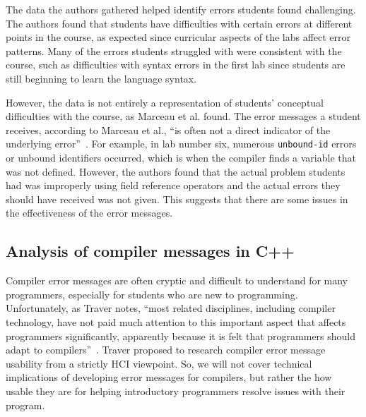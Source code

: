 \documentclass{sig-alternate}
\begin{document}
The data the authors gathered helped identify errors students found challenging.
The authors found that students have difficulties with certain errors at different points in the course, as expected since curricular aspects of the labs affect error patterns.
Many of the errors students struggled with were consistent with the course, such as difficulties with syntax errors in the first lab since students are still beginning to learn the language syntax.

However, the data is not entirely a representation of students' conceptual difficulties with the course, as Marceau et al. found.
The error messages a student receives, according to Marceau et al., ``is often not a direct indicator of the underlying error''~\cite{Marceau:2011:MEE:1953163.1953308}.
For example, in lab number six, numerous \texttt{unbound-id} errors  or unbound identifiers occurred, which is when the compiler finds a variable that was not defined.
However, the authors found that the actual problem students had was improperly using field reference operators and the actual errors they should have received was not given.
This suggests that there are some issues in the effectiveness of the error messages.

\subsection{Analysis of compiler messages in C++}\label{subsec:compiler analysis}

Compiler error messages are often cryptic and difficult to understand for many programmers, especially for students who are new to programming.
Unfortunately, as Traver notes, ``most related disciplines, including compiler technology, have not paid much attention to this important aspect that affects programmers significantly, apparently because it is felt that programmers should adapt to compilers''~\cite{Traver:2010}.
Traver proposed to research compiler error message usability from a strictly HCI viewpoint.
So, we will not cover technical implications of developing error messages for compilers, but rather the how usable they are for helping introductory programmers resolve issues with their program.
\end{document}
